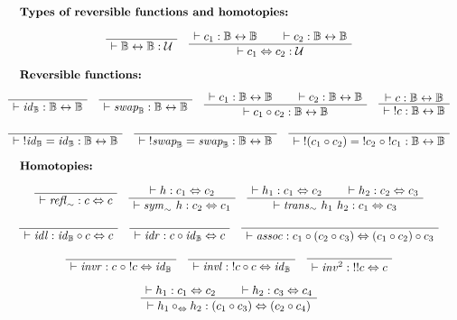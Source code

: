 \documentclass[format=acmlarge,review,natbib]{acmart}
\newcommand{\invc}[1]{!#1}
\newcommand{\compc}{\circ}
\newcommand{\reflh}{\mathit{refl}_{\sim}}
\newcommand{\symh}[1]{\mathit{sym}_{\sim}~#1}
\newcommand{\transh}[2]{\mathit{trans}_{\sim}~#1~#2}
\newcommand{\idc}{\mathit{id}_{\boolt}}
\newcommand{\swapc}{\mathit{swap}_{\boolt}}
\newcommand{\assocc}{\mathit{assoc}}
\newcommand{\invl}{\mathit{invl}}
\newcommand{\invr}{\mathit{invr}}
\newcommand{\invinv}{\mathit{inv}^2}
\newcommand{\idlc}{\mathit{idl}}
\newcommand{\idrc}{\mathit{idr}}
\newcommand{\compsim}{\compc_{\isotwo}}
\newcommand{\iso}{\leftrightarrow}
\newcommand{\isotwo}{\Leftrightarrow}
\newcommand{\boolt}{\mathbb{B}}
\newcommand{\univ}{\mathcal{U}}
\newcommand{\proves}{\vdash}
\newcommand{\jdg}[2]{\proves #1 : #2}
\newcommand{\jdge}[3]{\proves #1 = #2 : #3}
\begin{document}
\[\begin{array}{c}
  \noalign{\textbf{Types of reversible functions and homotopies:}} \\
  \AxiomC{}
  \UnaryInfC{$\jdg{\boolt\iso\boolt}{\univ}$}
  \DisplayProof
\quad
  \AxiomC{$\jdg{c_1}{\boolt\iso\boolt}$}
  \AxiomC{$\jdg{c_2}{\boolt\iso\boolt}$}
  \BinaryInfC{$\jdg{c_1 \isotwo c_2}{\univ}$}
  \DisplayProof
\\
\\
  \noalign{\textbf{Reversible functions:}} \\
  \AxiomC{}
  \UnaryInfC{$\jdg{\idc}{\boolt\iso\boolt}$}
  \DisplayProof
\quad
  \AxiomC{}
  \UnaryInfC{$\jdg{\swapc}{\boolt\iso\boolt}$}
  \DisplayProof
\quad
  \AxiomC{$\jdg{c_1}{\boolt\iso\boolt}$}
  \AxiomC{$\jdg{c_2}{\boolt\iso\boolt}$}
  \BinaryInfC{$\jdg{c_1 \compc c_2}{\boolt\iso\boolt}$}
  \DisplayProof
\quad
  \AxiomC{$\jdg{c}{\boolt\iso\boolt}$}
  \UnaryInfC{$\jdg{\;\invc{c}}{\boolt\iso\boolt}$}
  \DisplayProof
\\
\\
  \AxiomC{}
  \UnaryInfC{$\jdge{\;\invc{\idc}}{\idc}{\boolt\iso\boolt}$}
  \DisplayProof
\quad
  \AxiomC{}
  \UnaryInfC{$\jdge{\;\invc{\swapc}}{\swapc}{\boolt\iso\boolt}$}
  \DisplayProof
\quad
  \AxiomC{}
  \UnaryInfC{$\jdge{\;\invc{(c_1\compc c_2)}}{\;\invc{c_2}\;\compc\;\invc{c_1}}
                      {\boolt\iso\boolt}$}
  \DisplayProof
\\
\\
  \noalign{\textbf{Homotopies:}} \\
  \AxiomC{}
  \UnaryInfC{$\jdg{\reflh}{c \isotwo c}$}
  \DisplayProof
\quad
  \AxiomC{$\jdg{h}{c_1 \isotwo c_2}$}
  \UnaryInfC{$\jdg{\symh{h}}{c_2 \isotwo c_1}$}
  \DisplayProof
\quad
  \AxiomC{$\jdg{h_1}{c_1 \isotwo c_2}$}
  \AxiomC{$\jdg{h_2}{c_2 \isotwo c_3}$}
  \BinaryInfC{$\jdg{\transh{h_1}{h_2}}{c_1 \isotwo c_3}$}
  \DisplayProof
\\
\\
  \AxiomC{}
  \UnaryInfC{$\jdg{\idlc}{\idc \compc c \isotwo c}$}
  \DisplayProof
\quad
  \AxiomC{}
  \UnaryInfC{$\jdg{\idrc}{c \compc \idc \isotwo c}$}
  \DisplayProof
\quad
  \AxiomC{}
  \UnaryInfC{$\jdg{\assocc}
                   {c_1 \compc (c_2 \compc c_3) \isotwo (c_1 \compc c_2) \compc c_3}$}
  \DisplayProof
\\
\\
  \AxiomC{}
  \UnaryInfC{$\jdg{\invr}{c \;\compc \;\invc{c} \isotwo \idc}$}
  \DisplayProof
\quad
  \AxiomC{}
  \UnaryInfC{$\jdg{\invl}{\;\invc{c} \compc c \isotwo \idc}$}
  \DisplayProof
\quad
  \AxiomC{}
  \UnaryInfC{$\jdg{\invinv}{\;\invc{\invc{c}}  \isotwo c}$}
  \DisplayProof
\\
\\
  \AxiomC{$\jdg{h_1}{c_1 \isotwo c_2}$}
  \AxiomC{$\jdg{h_2}{c_3 \isotwo c_4}$}
  \BinaryInfC{$\jdg{h_1 \compsim h_2}{(c_1 \compc c_3) \isotwo (c_2 \compc c_4)}$}
  \DisplayProof
\end{array}\]
\end{document}
